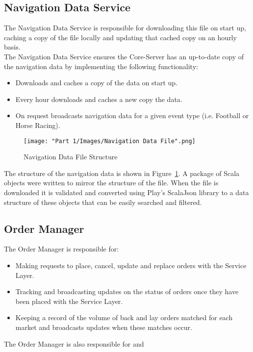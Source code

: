 	\subsection{Navigation Data Service}
					
	The Navigation Data Service is responsible for downloading this file on start up, caching a copy of the file locally and updating that cached copy on an hourly basis.\\ 
			
	The Navigation Data Service ensures the Core-Server has an up-to-date copy of the navigation data by implementing the following functionality:
		\begin{itemize}
			\item Downloads and caches a copy of the data on start up.
			\item Every hour downloads and caches a new copy the data.
			\item On request broadcasts navigation data for a given event type (i.e. Football or Horse Racing).
		\end{itemize}

	\begin{figure}[H]
		\centering
		\texttt{[image: "Part 1/Images/Navigation Data File".png]}
		\caption{Navigation Data File Structure}
    		\label{fig:navigationDataFile}
	\end{figure}	

	The structure of the navigation data is shown in Figure~\ref{fig:navigationDataFile}. A package of Scala objects were written to mirror the structure of the file. When the file is downloaded it is validated and converted using Play's ScalaJson library to a data structure of these objects that can be easily searched and filtered.
	
	\subsection{Order Manager}
	The Order Manager is responsible for:
	
	\begin{itemize}
		\item Making requests to place, cancel, update and replace orders with the Service Layer.
		\item Tracking and broadcasting updates on the status of orders once they have been placed with the Service Layer.
		\item Keeping a record of the volume of back and lay orders matched for each market and broadcasts updates when these matches occur.
	\end{itemize}	  The Order Manager is also responsible for  and 
	
